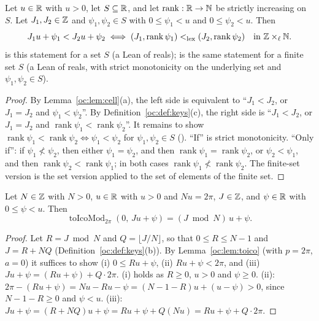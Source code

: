 \begin{lemma}\label{oc:lem:rank}
Let $u\in\mathbb R$ with $u>0$, let $S\subseteq\mathbb R$, and let $\operatorname{rank}:\mathbb R\to\mathbb N$ be strictly increasing
on $S$. Let $J_1,J_2\in\mathbb Z$ and $\psi_1,\psi_2\in S$ with $0\le\psi_1<u$ and $0\le\psi_2<u$. Then
\[J_1u+\psi_1<J_2u+\psi_2\iff(J_1,\operatorname{rank}\psi_1)<_{\mathrm{lex}}(J_2,\operatorname{rank}\psi_2)
\quad\text{in }\mathbb Z\times_\ell\mathbb N.\]
 is this statement for a set $S$ (a Lean  of reals);
 is the same statement for a finite set $S$ (a Lean  of reals,
with strict monotonicity on the underlying set and $\psi_1,\psi_2\in S$).
\end{lemma}
\begin{proof}
By Lemma~\ref{oc:lem:cell}(a), the left side is equivalent to ``$J_1<J_2$, or $J_1=J_2$ and
$\psi_1<\psi_2$''. By Definition~\ref{oc:def:keys}(c), the right side is ``$J_1<J_2$, or $J_1=J_2$ and
$\operatorname{rank}\psi_1<\operatorname{rank}\psi_2$''. It remains to show
$\operatorname{rank}\psi_1<\operatorname{rank}\psi_2\iff\psi_1<\psi_2$ for $\psi_1,\psi_2\in S$
(). ``If'' is strict monotonicity. ``Only if'': if $\psi_1\not<\psi_2$, then
either $\psi_1=\psi_2$, and then $\operatorname{rank}\psi_1=\operatorname{rank}\psi_2$, or $\psi_2<\psi_1$,
and then $\operatorname{rank}\psi_2<\operatorname{rank}\psi_1$; in both cases
$\operatorname{rank}\psi_1\not<\operatorname{rank}\psi_2$. The finite-set version is the set version
applied to the set of elements of the finite set.
\end{proof}

\begin{lemma}\label{oc:lem:reduce}
Let $N\in\mathbb Z$ with $N>0$, $u\in\mathbb R$ with $u>0$ and $Nu=2\pi$, $J\in\mathbb Z$, and $\psi\in\mathbb R$ with $0\le\psi<u$.
Then
\[\operatorname{toIcoMod}_{2\pi}(0,\,Ju+\psi)=(J\bmod N)\,u+\psi .\]
\end{lemma}
\begin{proof}
Let $R=J\bmod N$ and $Q=\lfloor J/N\rfloor$, so that $0\le R\le N-1$ and $J=R+NQ$
(Definition~\ref{oc:def:keys}(b)). By Lemma~\ref{oc:lem:toico} (with $p=2\pi$, $a=0$) it suffices to show
(i) $0\le Ru+\psi$, (ii) $Ru+\psi<2\pi$, and (iii) $Ju+\psi=(Ru+\psi)+Q\cdot2\pi$.
(i) holds as $R\ge0$, $u>0$ and $\psi\ge0$. (ii): $2\pi-(Ru+\psi)=Nu-Ru-\psi=(N-1-R)u+(u-\psi)>0$, since
$N-1-R\ge0$ and $\psi<u$. (iii): $Ju+\psi=(R+NQ)u+\psi=Ru+\psi+Q(Nu)=Ru+\psi+Q\cdot2\pi$.
\end{proof}

